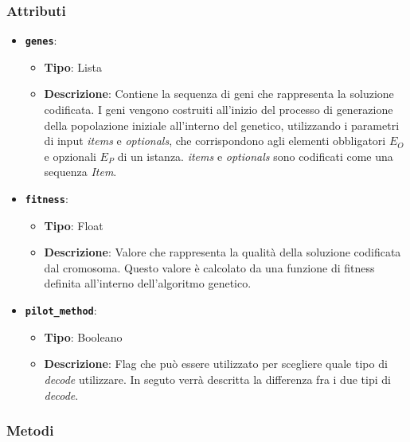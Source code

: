 \subsubsection*{Attributi}

\begin{itemize}
    \item \textbf{\texttt{genes}}:
    \begin{itemize}
        \item \textbf{Tipo}: Lista
        \item \textbf{Descrizione}: Contiene la sequenza di geni che rappresenta la soluzione codificata. I geni vengono costruiti all'inizio del processo di generazione della popolazione iniziale all'interno del genetico, utilizzando i parametri di input \emph{items} e \emph{optionals}, che corrispondono agli elementi obbligatori \( E_O \) e opzionali \( E_P \) di un istanza. \emph{items} e \emph{optionals} sono codificati come una sequenza \emph{Item}.
    \end{itemize}
    \item \textbf{\texttt{fitness}}:
    \begin{itemize}
        \item \textbf{Tipo}: Float
        \item \textbf{Descrizione}: Valore che rappresenta la qualità della soluzione codificata dal cromosoma. Questo valore è calcolato da una funzione di fitness definita all'interno dell'algoritmo genetico.
    \end{itemize}
    \item \textbf{\texttt{pilot\_method}}:
    \begin{itemize}
        \item \textbf{Tipo}: Booleano
        \item \textbf{Descrizione}: Flag che può essere utilizzato per scegliere quale tipo di \emph{decode} utilizzare. In seguto verrà descritta la differenza fra i due tipi di \emph{decode}.
    \end{itemize}
\end{itemize}

\subsubsection*{Metodi}

